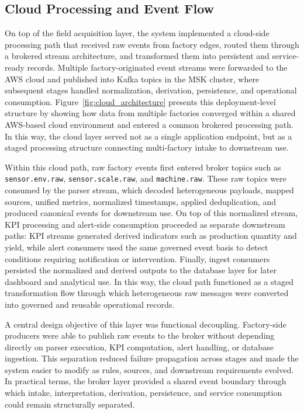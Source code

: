 \documentclass[systems,article,submit,pdftex,moreauthors]{Definitions/mdpi}
\begin{document}
\subsection{Cloud Processing and Event Flow}
\label{sec:cloud_processing}


On top of the field acquisition layer, the system implemented a cloud-side processing path that received raw events from factory edges, routed them through a brokered stream architecture, and transformed them into persistent and service-ready records. Multiple factory-originated event streams were forwarded to the AWS cloud and published into Kafka topics in the MSK cluster, where subsequent stages handled normalization, derivation, persistence, and operational consumption. Figure~\ref{fig:cloud_architecture} presents this deployment-level structure by showing how data from multiple factories converged within a shared AWS-based cloud environment and entered a common brokered processing path. In this way, the cloud layer served not as a single application endpoint, but as a staged processing structure connecting multi-factory intake to downstream use.

Within this cloud path, raw factory events first entered broker topics such as \texttt{sensor.env.raw}, \texttt{sensor.scale.raw}, and \texttt{machine.raw}. These raw topics were consumed by the parser stream, which decoded heterogeneous payloads, mapped sources, unified metrics, normalized timestamps, applied deduplication, and produced canonical events for downstream use. On top of this normalized stream, KPI processing and alert-side consumption proceeded as separate downstream paths: KPI streams generated derived indicators such as production quantity and yield, while alert consumers used the same governed event basis to detect conditions requiring notification or intervention. Finally, ingest consumers persisted the normalized and derived outputs to the database layer for later dashboard and analytical use. In this way, the cloud path functioned as a staged transformation flow through which heterogeneous raw messages were converted into governed and reusable operational records.

A central design objective of this layer was functional decoupling. Factory-side producers were able to publish raw events to the broker without depending directly on parser execution, KPI computation, alert handling, or database ingestion. This separation reduced failure propagation across stages and made the system easier to modify as rules, sources, and downstream requirements evolved. In practical terms, the broker layer provided a shared event boundary through which intake, interpretation, derivation, persistence, and service consumption could remain structurally separated.
\end{document}
